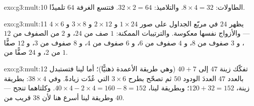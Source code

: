 \begin{solution}{exo:g3:mult:10}
الطاولات: $8 \times 4 = 32$. والتلاميذ: $32 \times 2 = 64$. فتتسع
الغرفة $64$ تلميذًا.
\end{solution}

\begin{solution}{exo:g3:mult:11}
يظهر $24$ في مربّع الجداول على صور $1 \times 24$ و $2 \times 12$
و $3 \times 8$ و $4 \times 6$ --- والأزواج نفسها معكوسة. والترتيبات
الممكنة: $1$ صف من $24$، و $2$ من الصفوف من $12$، و $3$ صفوف من $8$،
و $4$ صفوف من $6$، و $6$ صفوف من $4$، و $8$ صفوف من $3$، و $12$ صفًّا من $2$،
و $24$ صفًّا من $1$.
\end{solution}

\begin{solution}{exo:g3:mult:12}
تفكّك زينة $47$ إلى $40 + 7$ (وهي طريقة الأعمدة ذهنيًّا)؛ أما
لينا فتستبدل بالعدد $47$ العددَ الودود $50$ ثم تصحّح بطرح
$3 \times 6$ التي عُدّت زيادةً. وفي $38 \times 4$: بطريقة زينة،
$120 + 32 = 152$؛ وبطريقة لينا، $40 \times 4 - 2 \times 4 = 160 - 8 =
152$. وكلتاهما تنجح --- وطريقة لينا أسرع هنا لأن $38$ قريب من
$40$.
\end{solution}

